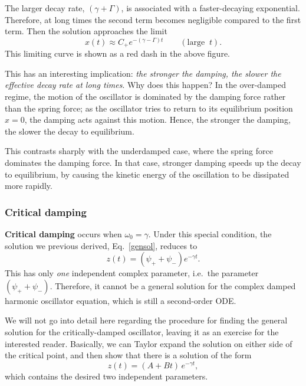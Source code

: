 \documentclass[10pt,a4paper]{article}
\begin{document}
    
    
    The larger decay rate, $(\gamma + \Gamma)$, is associated with a
faster-decaying exponential. Therefore, at long times the second term
becomes negligible compared to the first term. Then the solution
approaches the limit
\begin{equation}
x(t) \approx C_+ e^{-(\gamma - \Gamma) t} \qquad (\mathrm{large}\;\;t).
\end{equation}
This limiting curve is shown as a red dash in the above figure.

This has an interesting implication: \emph{the stronger the damping, the
slower the effective decay rate at long times}. Why does this happen? In
the over-damped regime, the motion of the oscillator is dominated by the
damping force rather than the spring force; as the oscillator tries to
return to its equilibrium position $x = 0$, the damping acts against
this motion. Hence, the stronger the damping, the slower the decay to
equilibrium.

This contrasts sharply with the underdamped case, where the spring
force dominates the damping force. In that case, stronger damping
speeds up the decay to equilibrium, by causing the kinetic energy of
the oscillation to be dissipated more rapidly.

\subsubsection{Critical damping}
\label{critical-damping}

\textbf{Critical damping} occurs when $\omega_0 = \gamma$. Under this
special condition, the solution we previous derived,
Eq.~\eqref{gensol}, reduces to
\begin{equation}
z(t) = \left(\psi_+ + \psi_-\right) e^{-\gamma t}.
\end{equation}
This has only \emph{one} independent complex parameter, i.e.~the
parameter $(\psi_+ + \psi_-)$. Therefore, it cannot be a general
solution for the complex damped harmonic oscillator equation, which is
still a second-order ODE.

We will not go into detail here regarding the procedure for finding
the general solution for the critically-damped oscillator, leaving it
as an exercise for the interested reader. Basically, we can Taylor
expand the solution on either side of the critical point, and then
show that there is a solution of the form
\begin{equation}
z(t) = \left(A + B t\right)\, e^{-\gamma t},
\label{criticalsol}
\end{equation}
which contains the desired two independent parameters.
\end{document}
